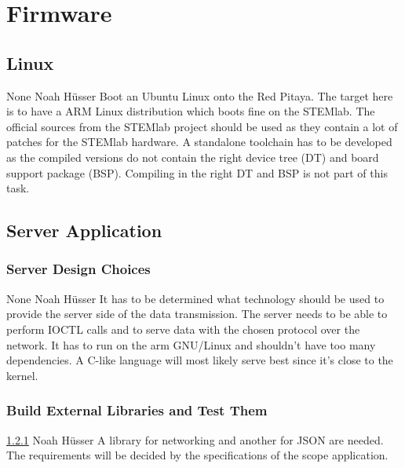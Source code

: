 \documentclass[a4paper,oneside]{alpenspecs/alpenspecs}
\begin{document}
\section{Firmware}
\label{sec:firmware}

\subsection{Linux}
\label{subsec:fw:linux}

\wpac
    {}
    {}
    {}
    {None}
    {}
    {Noah H\"usser}
    {%
    Boot an Ubuntu Linux onto the Red Pitaya.%
    The target here  is to have a  ARM Linux distribution which  boots fine on
    the STEMlab.  The official sources  from the STEMlab project should be
    used as they contain a lot of patches for the STEMlab hardware.
    A standalone toolchain has to be developed as the compiled versions do not
    contain the right device tree (DT) and board support package (BSP).
    Compiling in the right DT and BSP is not part of this task.
    }

\subsection{Server Application}
\label{subsec:fw:server}

\subsubsection{Server Design Choices}
\label{subsubsec:fw:server:design-decisions}
\wpac
    {}
    {}
    {}
    {None}
    {}
    {Noah H\"usser}
    {%
        It has to be determined what  technology should be used to provide the
        server side of the data transmission.   The server needs to be able to
        perform IOCTL  calls and to serve  data with the chosen  protocol over
        the network. It has to run on the arm GNU/Linux and shouldn't have too
        many  dependencies.  A  C-like language  will most  likely serve  best
        since it's close to the kernel.
    }

\subsubsection{Build External Libraries and Test Them}
\label{subsubsec:fw:server:external}
\wpac
    {}
    {}
    {}
    {\ref{subsubsec:fw:server:design-decisions}}
    {}
    {Noah H\"usser}
    {%
        A  library  for  networking  and  another  for  JSON  are  needed. The
        requirements  will  be decided  by  the  specifications of  the  scope
        application.
    }
\end{document}
